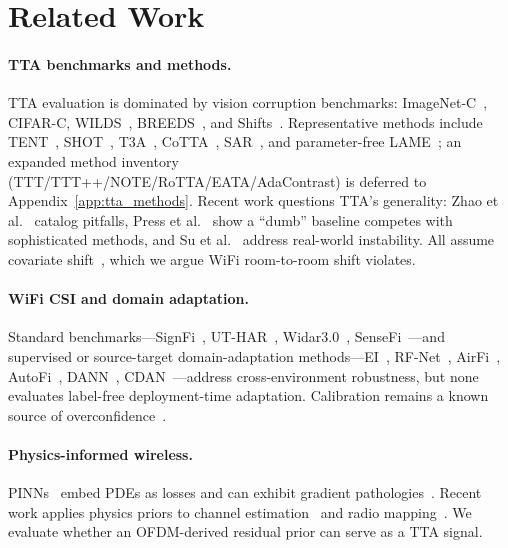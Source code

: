 \section{Related Work}

\paragraph{TTA benchmarks and methods.} TTA evaluation is dominated by vision corruption benchmarks: ImageNet-C~\cite{hendrycks2019benchmarking}, CIFAR-C, WILDS~\cite{koh2021wilds}, BREEDS~\cite{santurkar2020breeds}, and Shifts~\cite{malinin2022shifts}. Representative methods include TENT~\cite{wang2021tent}, SHOT~\cite{liang2020shot}, T3A~\cite{iwasawa2021t3a}, CoTTA~\cite{wang2022cotta}, SAR~\cite{niu2023sar}, and parameter-free LAME~\cite{boudiaf2022lame}; an expanded method inventory (TTT/TTT++/NOTE/RoTTA/EATA/AdaContrast) is deferred to Appendix~\ref{app:tta_methods}. Recent work questions TTA's generality: Zhao et al.~\cite{zhao2023pitfalls} catalog pitfalls, Press et al.~\cite{press2024rdumb} show a ``dumb'' baseline competes with sophisticated methods, and Su et al.~\cite{su2024tribe} address real-world instability. All assume covariate shift~\cite{shimodaira2000covariate,quinonero2009dataset_shift}, which we argue WiFi room-to-room shift violates.

\paragraph{WiFi CSI and domain adaptation.} Standard benchmarks---SignFi~\cite{ma2018signfi}, UT-HAR~\cite{yousefi2017uthar}, Widar3.0~\cite{zheng2019widar}, SenseFi~\cite{yang2023sensefi}---and supervised or source-target domain-adaptation methods---EI~\cite{jiang2018ei}, RF-Net~\cite{ding2020rfnet}, AirFi~\cite{jiang2022airfi}, AutoFi~\cite{yang2024autofi}, DANN~\cite{ganin2016dann}, CDAN~\cite{long2018cdan}---address cross-environment robustness, but none evaluates label-free deployment-time adaptation. Calibration remains a known source of overconfidence~\cite{guo2017calibration,muller2019labelsmoothing}.

\paragraph{Physics-informed wireless.} PINNs~\cite{raissi2019pinns,karniadakis2021physics} embed PDEs as losses and can exhibit gradient pathologies~\cite{wang2021gradflow,krishnapriyan2021pinn_failures}. Recent work applies physics priors to channel estimation~\cite{javid2025nips} and radio mapping~\cite{boeck2025icml}. We evaluate whether an OFDM-derived residual prior can serve as a TTA signal.
